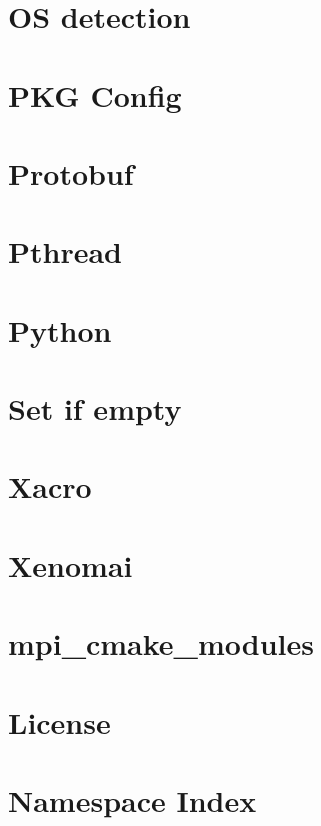 \documentclass[twoside]{book}
\newcommand{\+}{\discretionary{\mbox{\scriptsize$\hookleftarrow$}}{}{}}
\begin{document}
\chapter{OS detection}
\label{md_doc_os_detection}
\hypertarget{md_doc_os_detection}{}

\chapter{P\+KG Config}
\label{md_doc_pkg_config}
\hypertarget{md_doc_pkg_config}{}

\chapter{Protobuf}
\label{md_doc_protobuf}
\hypertarget{md_doc_protobuf}{}

\chapter{Pthread}
\label{md_doc_pthread}
\hypertarget{md_doc_pthread}{}

\chapter{Python}
\label{md_doc_python}
\hypertarget{md_doc_python}{}

\chapter{Set if empty}
\label{md_doc_set_if_empty}
\hypertarget{md_doc_set_if_empty}{}

\chapter{Xacro}
\label{md_doc_xacro}
\hypertarget{md_doc_xacro}{}

\chapter{Xenomai}
\label{md_doc_xenomai}
\hypertarget{md_doc_xenomai}{}

\chapter{mpi\+\_\+cmake\+\_\+modules}
\label{md_readme}
\hypertarget{md_readme}{}

\chapter{License}
\label{license}
\hypertarget{license}{}

\chapter{Namespace Index}

\end{document}
